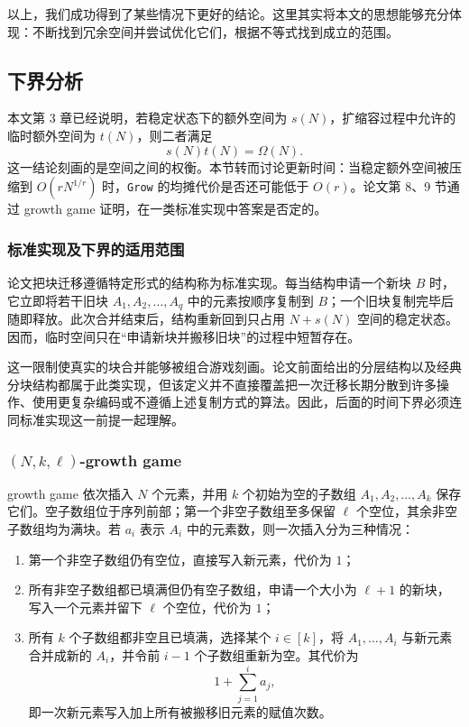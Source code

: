 \documentclass[12pt,a4paper]{article}
\begin{document}
以上，我们成功得到了某些情况下更好的结论。这里其实将本文的思想能够充分体现：不断找到冗余空间并尝试优化它们，根据不等式找到成立的范围。


\subsection{下界分析}

本文第 3 章已经说明，若稳定状态下的额外空间为 $s(N)$，扩缩容过程中允许的临时额外空间为 $t(N)$，则二者满足
\[
    s(N)t(N)=\Omega(N).
\]
这一结论刻画的是空间之间的权衡。本节转而讨论更新时间：当稳定额外空间被压缩到 $O(rN^{1/r})$ 时，\texttt{Grow} 的均摊代价是否还可能低于 $O(r)$。论文第 8、9 节通过 growth game 证明，在一类标准实现中答案是否定的\cite{tarjan2023optimalresizablearrays}。

\subsubsection{标准实现及下界的适用范围}

论文把块迁移遵循特定形式的结构称为标准实现。每当结构申请一个新块 $B$ 时，它立即将若干旧块 $A_1,A_2,\ldots,A_q$ 中的元素按顺序复制到 $B$；一个旧块复制完毕后随即释放。此次合并结束后，结构重新回到只占用 $N+s(N)$ 空间的稳定状态。因而，临时空间只在“申请新块并搬移旧块”的过程中短暂存在。

这一限制使真实的块合并能够被组合游戏刻画。论文前面给出的分层结构以及经典分块结构都属于此类实现，但该定义并不直接覆盖把一次迁移长期分散到许多操作、使用更复杂编码或不遵循上述复制方式的算法。因此，后面的时间下界必须连同标准实现这一前提一起理解。

\subsubsection{$(N,k,\ell)$-growth game}

growth game 依次插入 $N$ 个元素，并用 $k$ 个初始为空的子数组 $A_1,A_2,\ldots,A_k$ 保存它们。空子数组位于序列前部；第一个非空子数组至多保留 $\ell$ 个空位，其余非空子数组均为满块。若 $a_i$ 表示 $A_i$ 中的元素数，则一次插入分为三种情况：

\begin{enumerate}
    \item 第一个非空子数组仍有空位，直接写入新元素，代价为 $1$；
    \item 所有非空子数组都已填满但仍有空子数组，申请一个大小为 $\ell+1$ 的新块，写入一个元素并留下 $\ell$ 个空位，代价为 $1$；
    \item 所有 $k$ 个子数组都非空且已填满，选择某个 $i\in[k]$，将 $A_1,\ldots,A_i$ 与新元素合并成新的 $A_i$，并令前 $i-1$ 个子数组重新为空。其代价为
    \[
        1+\sum_{j=1}^{i}a_j,
    \]
    即一次新元素写入加上所有被搬移旧元素的赋值次数。
\end{enumerate}
\end{document}
